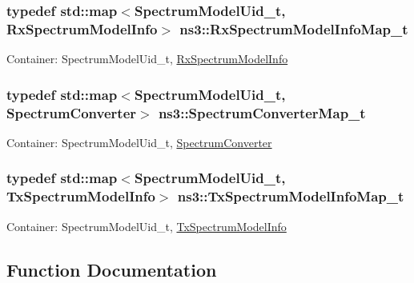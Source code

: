 \subsubsection[{\texorpdfstring{Rx\+Spectrum\+Model\+Info\+Map\+\_\+t}{RxSpectrumModelInfoMap_t}}]{\setlength{\rightskip}{0pt plus 5cm}typedef std\+::map$<$Spectrum\+Model\+Uid\+\_\+t, Rx\+Spectrum\+Model\+Info$>$ {\bf ns3\+::\+Rx\+Spectrum\+Model\+Info\+Map\+\_\+t}}\hypertarget{group__spectrum_ga801b24c7ce914a3fc46a57a68bae76ee}{}\label{group__spectrum_ga801b24c7ce914a3fc46a57a68bae76ee}
Container\+: Spectrum\+Model\+Uid\+\_\+t, \hyperlink{classns3_1_1RxSpectrumModelInfo}{Rx\+Spectrum\+Model\+Info} 
\subsubsection[{\texorpdfstring{Spectrum\+Converter\+Map\+\_\+t}{SpectrumConverterMap_t}}]{\setlength{\rightskip}{0pt plus 5cm}typedef std\+::map$<$Spectrum\+Model\+Uid\+\_\+t, Spectrum\+Converter$>$ {\bf ns3\+::\+Spectrum\+Converter\+Map\+\_\+t}}\hypertarget{group__spectrum_ga47089dbfa7f7955f2b2082c1da395450}{}\label{group__spectrum_ga47089dbfa7f7955f2b2082c1da395450}
Container\+: Spectrum\+Model\+Uid\+\_\+t, \hyperlink{classns3_1_1SpectrumConverter}{Spectrum\+Converter} 
\subsubsection[{\texorpdfstring{Tx\+Spectrum\+Model\+Info\+Map\+\_\+t}{TxSpectrumModelInfoMap_t}}]{\setlength{\rightskip}{0pt plus 5cm}typedef std\+::map$<$Spectrum\+Model\+Uid\+\_\+t, Tx\+Spectrum\+Model\+Info$>$ {\bf ns3\+::\+Tx\+Spectrum\+Model\+Info\+Map\+\_\+t}}\hypertarget{group__spectrum_ga3b72b7d13697ed8fe482072a7096c289}{}\label{group__spectrum_ga3b72b7d13697ed8fe482072a7096c289}
Container\+: Spectrum\+Model\+Uid\+\_\+t, \hyperlink{classns3_1_1TxSpectrumModelInfo}{Tx\+Spectrum\+Model\+Info} 

\subsection{Function Documentation}
